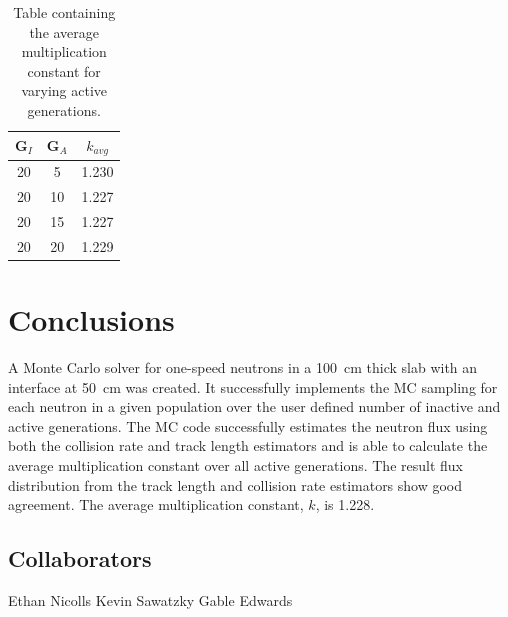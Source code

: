 \documentclass[letterpaper]{article}
\begin{document}
 \begin{table}[hbt!]
    \caption{Table containing the average multiplication constant for varying active generations.}
    \label{tab:mult}
    \centering
    \begin{tabular}{ |ccc| }
    \hline 
  G$_I$ & G$_A$ & $k_{avg}$ \\
    \hline 
    20 & 5 &  1.230 \\
    20 & 10 & 1.227 \\
    20 & 15 & 1.227 \\
    20 & 20 & 1.229 \\
    \hline 
    \end{tabular}
\end{table}

\section{Conclusions}
A Monte Carlo solver for one-speed neutrons in a \SI{100}{\cm} thick slab with an interface at \SI{50}{\cm} was created. It successfully implements the MC sampling for each neutron in a given population over the user defined number of inactive and active generations. The MC code successfully estimates the neutron flux using both the collision rate and track length estimators and is able to calculate the average multiplication constant over all active generations. The result flux distribution from the track length and collision rate estimators show good agreement. The average multiplication constant, $k$, is 1.228.

\subsection{Collaborators}
Ethan Nicolls
Kevin Sawatzky
Gable Edwards

\pagebreak


\end{document}
